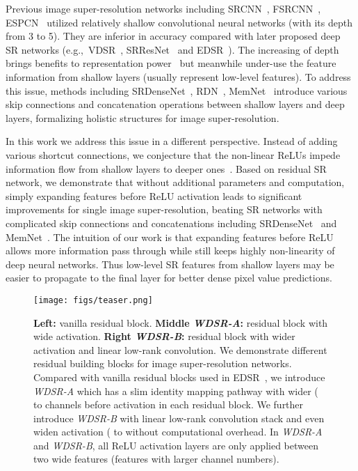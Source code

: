 \documentclass{article}
\begin{document}
Previous image super-resolution networks including SRCNN~\cite{dong2014learning}, FSRCNN~\cite{dong2016accelerating}, ESPCN~\cite{shi2016real} utilized relatively shallow convolutional neural networks (with its depth from 3 to 5). They are inferior in accuracy compared with later proposed deep SR networks (e.g.,\ VDSR~\cite{kim2016accurate}, SRResNet~\cite{ledig2016photo} and EDSR~\cite{lim2017enhanced}). The increasing of depth brings benefits to representation power~\cite{cohen2016expressive, eldan2016power, liang2016deep, scarselli1998universal} but meanwhile under-use the feature information from shallow layers (usually represent low-level features). To address this issue, methods including SRDenseNet~\cite{tong2017image}, RDN~\cite{2018arXiv180208797Z}, MemNet~\cite{tai2017memnet} introduce various skip connections and concatenation operations between shallow layers and deep layers, formalizing holistic structures for image super-resolution.

In this work we address this issue in a different perspective. Instead of adding various shortcut connections, we conjecture that the non-linear ReLUs impede information flow from shallow layers to deeper ones~\cite{sandler2018inverted}. Based on residual SR network, we demonstrate that without additional parameters and computation, simply expanding features before ReLU activation leads to significant improvements for single image super-resolution, beating SR networks with complicated skip connections and concatenations including SRDenseNet~\cite{tong2017image} and MemNet~\cite{tai2017memnet}. The intuition of our work is that expanding features before ReLU allows more information pass through while still keeps highly non-linearity of deep neural networks. Thus low-level SR features from shallow layers may be easier to propagate to the final layer for better dense pixel value predictions.

\begin{figure}[t]
\centering
\texttt{[image: figs/teaser.png]}
\caption{\textbf{Left:} vanilla residual block. \textbf{Middle \textit{WDSR-A}:} residual block with wide activation. \textbf{Right \textit{WDSR-B}:} residual block with wider activation and linear low-rank convolution. We demonstrate different residual building blocks for image super-resolution networks. Compared with vanilla residual blocks used in EDSR~\cite{lim2017enhanced}, we introduce \textit{WDSR-A} which has a slim identity mapping pathway with wider ( to  channels before activation in each residual block. We further introduce \textit{WDSR-B} with linear low-rank convolution stack and even widen activation ( to  without computational overhead. In \textit{WDSR-A} and \textit{WDSR-B}, all ReLU activation layers are only applied between two wide features (features with larger channel numbers).}
\label{fig:wide}
\end{figure}
\end{document}
